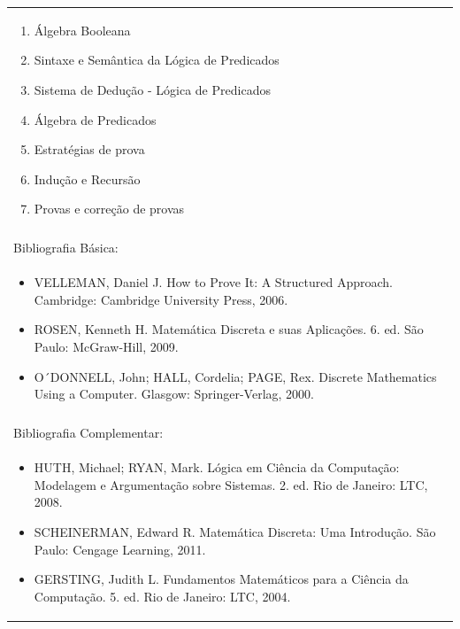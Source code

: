 \documentclass[11pt]{article}
\begin{document}
\begin{center}
\begin{longtable}{|p{4cm}|p{4cm}|p{4cm}|p{4cm}|}
{\begin{enumerate}
\item Álgebra Booleana
\item Sintaxe e Semântica da Lógica de Predicados
\item Sistema de Dedução - Lógica de Predicados
\item Álgebra de Predicados
\item Estratégias de prova
\item Indução e Recursão
\item Provas e correção de provas\end{enumerate}}\\
\multicolumn{4}{|p{16cm}|}{}\\
\hline
\multicolumn{4}{|p{16cm}|}{Bibliografia Básica:}\\
\multicolumn{4}{|p{16cm}|}{%
\begin{itemize}\item VELLEMAN, Daniel J. How to Prove It: A Structured Approach. Cambridge: Cambridge University Press, 2006.
\item ROSEN, Kenneth H. Matemática Discreta e suas Aplicações. 6. ed. São Paulo: McGraw-Hill, 2009.
\item O´DONNELL, John; HALL, Cordelia; PAGE, Rex. Discrete Mathematics Using a Computer. Glasgow: Springer-Verlag, 2000.\end{itemize}}\\
\multicolumn{4}{|p{16cm}|}{}\\
\hline
\multicolumn{4}{|p{16cm}|}{Bibliografia Complementar:}\\
\multicolumn{4}{|p{16cm}|}{%
\begin{itemize}\item HUTH, Michael; RYAN, Mark. Lógica em Ciência da Computação: Modelagem e Argumentação sobre Sistemas. 2. ed. Rio de Janeiro: LTC, 2008.
\item SCHEINERMAN, Edward R. Matemática Discreta: Uma Introdução. São Paulo: Cengage Learning, 2011.
\item GERSTING, Judith L. Fundamentos Matemáticos para a Ciência da Computação. 5. ed. Rio de Janeiro: LTC, 2004.\end{itemize}}\\
\hline
\end{longtable}
\end{center}
\end{document}
